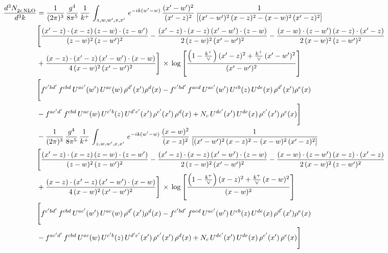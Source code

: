 \documentclass[9pt]{article}
\numberwithin{equation}{section}
\begin{document}
\begin{align}
    \frac{d^{3}N_{2c\,\rm NLO}^{\rm}}{d^{3}k}  & =  \frac{1}{(2\pi)^{3}}\, \frac{g^{4}}{8\pi^{5}}\,\frac{1}{k^{+}}\,\int_{z,w,w^{\prime},x,x'}\, e^{-ik(w^{\prime}-w)}\,\frac{(x'-w')^{2}}{(x'-z)^{2}}\, \frac{1}{\left[(x'-w')^{2}\, (x-z)^{2} - (x-w)^{2}\, (x'-z)^{2}\right]} \notag \\ & \Bigg[\frac{(x'-z)\cdot (x-z)\, (z-w)\cdot (z-w')}{(z-w)^{2}\, (z-w')^{2}}-\frac{(x'-z)\cdot (x-z)\, (x'-w')\cdot (z-w)}{2\, (z-w)^{2}\, (x'-w')^{2}} -\frac{(x-w)\cdot (z-w')\, (x-z)\cdot (x'-z)}{2\, (x-w)^{2}\, (z-w')^{2}}\notag \\ & +\frac{(x-z)\cdot (x'-z)\, (x'-w')\cdot (x-w)}{4\, (x-w)^{2}\, (x'-w')^{2}}\Bigg]\,\times\, \log{\left[\frac{\left(1-\frac{k^{+}}{\vee}\right)(x'-z)^{2}+\frac{k^{+}}{\vee}\,(x'-w')^{2}}{(x'-w')^{2}}\right]} \notag \\ &  \Bigg[f^{c'bd'}\,f^{cbd}\, U^{ac'}(w')\,U^{ac}(w)\,\rho^{d'}(x')\rho^{d}(x)- f^{c'bd'}\,f^{acd}\,U^{ac'}(w')\,U^{cb}(z)\,U^{de}(x)\,\rho^{d'}(x')\rho^{e}(x) \notag \\ & -f^{ac'd'}\,f^{cbd}\,U^{ac}(w)\,U^{c'b}(z)\,U^{d'e'}(x')\,\rho^{e'}(x')\,\rho^{d}(x) +N_{c}\,U^{de'}(x')\,U^{de}(x)\,\rho^{e'}(x')\,\rho^{e}(x)\Bigg] \notag \\
& -\frac{1}{(2\pi)^{3}}\, \frac{g^{4}}{8\pi^{5}}\,\frac{1}{k^{+}}\,\int_{z,w,w^{\prime},x,x'}\, e^{-ik(w^{\prime}-w)}\,\frac{(x-w)^{2}}{(x-z)^{2}}\, \frac{1}{\left[(x'-w')^{2}\, (x-z)^{2} - (x-w)^{2}\, (x'-z)^{2}\right]} \notag \\ & \Bigg[\frac{(x'-z)\cdot (x-z)\, (z-w)\cdot (z-w')}{(z-w)^{2}\, (z-w')^{2}}-\frac{(x'-z)\cdot (x-z)\, (x'-w')\cdot (z-w)}{2\, (z-w)^{2}\, (x'-w')^{2}} -\frac{(x-w)\cdot (z-w')\, (x-z)\cdot (x'-z)}{2\, (x-w)^{2}\, (z-w')^{2}}\notag \\ & +\frac{(x-z)\cdot (x'-z)\, (x'-w')\cdot (x-w)}{4\, (x-w)^{2}\, (x'-w')^{2}}\Bigg]\,\times\, \log{\left[\frac{\left(1-\frac{k^{+}}{\vee}\right)(x-z)^{2}+\frac{k^{+}}{\vee}\,(x-w)^{2}}{(x-w)^{2}}\right]} \notag \\ &  \Bigg[f^{c'bd'}\,f^{cbd}\, U^{ac'}(w')\,U^{ac}(w)\,\rho^{d'}(x')\rho^{d}(x)- f^{c'bd'}\,f^{acd}\,U^{ac'}(w')\,U^{cb}(z)\,U^{de}(x)\,\rho^{d'}(x')\rho^{e}(x) \notag \\ & -f^{ac'd'}\,f^{cbd}\,U^{ac}(w)\,U^{c'b}(z)\,U^{d'e'}(x')\,\rho^{e'}(x')\,\rho^{d}(x) +N_{c}\,U^{de'}(x')\,U^{de}(x)\,\rho^{e'}(x')\,\rho^{e}(x)\Bigg]
\end{align}
\end{document}
